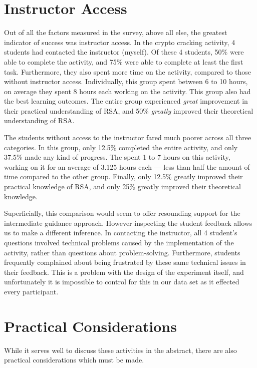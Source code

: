 
    \section{Instructor Access}
        Out of all the factors measured in the survey, above all else, the greatest indicator of success was instructor access. 
        In the crypto cracking activity, 4 students had contacted the instructor (myself). 
        Of these 4 students, 50\% were able to complete the activity, and 75\% were able to complete at least the first task. 
        Furthermore, they also spent more time on the activity, compared to those without instructor access. 
        Individually, this group spent between 6 to 10 hours, on average they spent 8 hours each working on the activity. 
        This group also had the best learning outcomes. 
        The entire group experienced \emph{great} improvement in their practical understanding of RSA, and 50\% \emph{greatly} improved their theoretical understanding of RSA.

        The students without access to the instructor fared much poorer across all three categories. 
        In this group, only 12.5\% completed the entire activity, and only 37.5\% made any kind of progress. 
        The spent 1 to 7 hours on this activity, working on it for an average of 3.125 hours each --- 
        less than half the amount of time compared to the other group. 
        Finally, only 12.5\% greatly improved their practical knowledge of RSA, and only 25\% greatly improved their theoretical knowledge. 

        Superficially, this comparison would seem to offer resounding support for the intermediate guidance approach. 
        However inspecting the student feedback allows us to make a different inference. 
        In contacting the instructor, all 4 student's questions involved technical problems caused by the implementation of the activity, rather than questions about problem-solving. 
        Furthermore, students frequently complained about being frustrated by these same technical issues in their feedback. 
        This is a problem with the design of the experiment itself, and unfortunately it is impossible to control for this in our data set as it effected every participant. 

\section{Practical Considerations}
    While it serves well to discuss these activities in the abstract, there are also practical considerations which must be made. 
    
